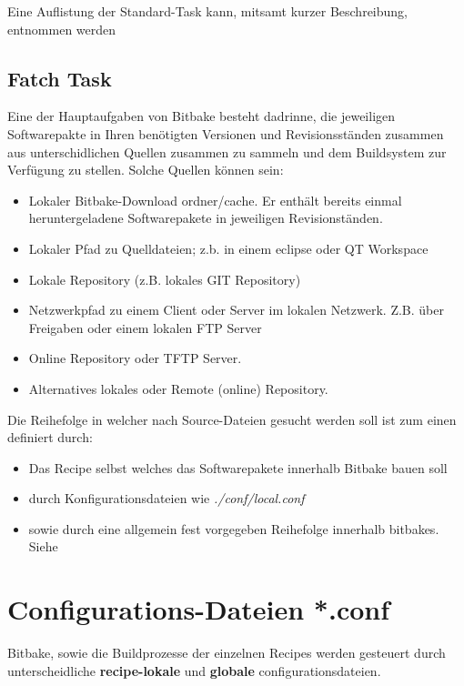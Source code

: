 Eine Auflistung der Standard-Task kann, mitsamt kurzer Beschreibung,
entnommen werden
\cite[S. 171-172]{Gonzalez2018:Embedded_Linux_Development_Using_Yocto_Project_Cookbook_2nd}

\subsection{Fatch Task}%
\label{sub:fatch_task}
Eine der Hauptaufgaben von Bitbake besteht dadrinne, die jeweiligen
Softwarepakte in Ihren benötigten Versionen und Revisionsständen zusammen aus
unterschidlichen Quellen zusammen zu sammeln und dem Buildsystem zur Verfügung
zu stellen. Solche Quellen können sein:

\begin{itemize}
    \item Lokaler Bitbake-Download ordner/cache. Er enthält bereits einmal
        heruntergeladene Softwarepakete in jeweiligen Revisionständen.
    \item Lokaler Pfad zu Quelldateien; z.b. in einem eclipse oder QT Workspace
    \item Lokale Repository (z.B. lokales GIT Repository)
    \item Netzwerkpfad zu einem Client oder Server im lokalen Netzwerk. Z.B.
        über Freigaben oder einem lokalen FTP Server
    \item Online Repository oder TFTP Server.
    \item Alternatives lokales oder Remote (online) Repository.
\end{itemize}

Die Reihe\-folge in welcher nach Source-Dateien gesucht werden soll ist zum
einen definiert durch:

\begin{itemize}
    \item Das Recipe selbst welches das Software\-pakete innerhalb Bitbake bauen
        soll
    \item durch Konfigurationsdateien wie \textit{./conf/local.conf}
    \item sowie durch eine allgemein fest vorgegeben Reihefolge innerhalb
    bitbakes. Siehe
    \cite[S.53]{Gonzalez2018:Embedded_Linux_Development_Using_Yocto_Project_Cookbook_2nd}
\end{itemize}



\section{Configurations-Dateien *.conf}%
\label{sec:configurations_dateien_conf}
Bitbake, sowie die Buildprozesse der einzelnen Recipes
werden gesteuert durch unterscheidliche \textbf{recipe-lokale} und
\textbf{globale} configurationsdateien.




